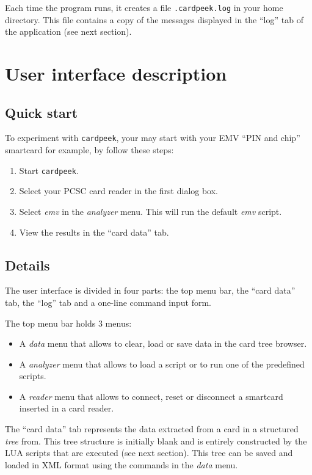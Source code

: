 \documentclass[11pt]{article}
\begin{document}
Each time the program runs, it creates a file \texttt{.cardpeek.log} in your home directory.
This file contains a copy of the messages displayed in the ``log'' tab of the application (see next section). 

\section{User interface description}

\subsection{Quick start}

To experiment with \texttt{cardpeek}, your may start with your EMV ``PIN and chip'' smartcard for example, by follow these steps:
\begin{enumerate}
\item{Start \texttt{cardpeek}.}
\item{Select your PCSC card reader in the first dialog box.}
\item{Select \emph{emv} in the \emph{analyzer} menu. This will run the default \emph{emv} script.}
\item{View the results in the ``card data'' tab.}
\end{enumerate}

\subsection{Details}

The user interface is divided in four parts: the top menu bar, the ``card data'' tab, the ``log'' tab and a one-line command input form.

The top menu bar holds 3 menus:
\begin{itemize}
\item{A \emph{data} menu that allows to clear, load or save data in the card tree browser.}  
\item{A \emph{analyzer} menu that allows to load a script or to run one of the predefined scripts.}
\item{A \emph{reader} menu that allows to connect, reset or disconnect a smartcard inserted in a card reader.}
\end{itemize}

The ``card data'' tab represents the data extracted from a card in a structured \emph{tree} from.
This tree structure is initially blank and is entirely constructed by the LUA scripts that are executed (see next section).
This tree can be saved and loaded in XML format using the commands in the \emph{data} menu.
\end{document}
